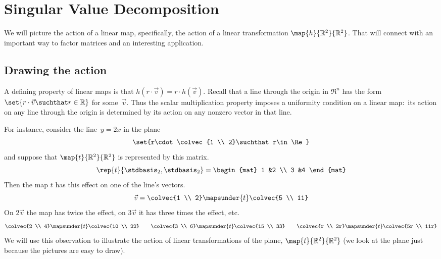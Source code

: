 \chapter{Singular Value Decomposition}
\label{chap:SingularValueDecomposition}

We will picture the action of a linear map,
specifically, the action of a linear transformation $\map{h}{\Re^2}{\Re^2}$.
That will connect with an important way to factor matrices
and an interesting application.


\section{Drawing the action}
A defining property of linear maps is that 
$h(r\cdot\vec{v})=r\cdot h(\vec{v})$.
Recall that a line through the origin in $\Re^n$ has the form 
$\set{r\cdot \vec{v}\suchthat r\in\Re}$ for some~$\vec{v}$. 
Thus the scalar multiplication property  
imposes a uniformity condition on a linear map:~its action on any 
line through the origin is determined by its action
on any nonzero vector in that line.

For instance, consider the line~$y=2x$ in the plane
\begin{equation*}
  \set{r\cdot\colvec{1 \\ 2}\suchthat r\in\Re}
\end{equation*}
and suppose that $\map{t}{\Re^2}{\Re^2}$ is represented by this matrix.
\begin{equation*}
  \rep{t}{\stdbasis_2,\stdbasis_2}
  =
  \begin{mat}
    1 &2 \\
    3 &4
  \end{mat}
\end{equation*}
Then the map $t$ has this effect on one of the line's vectors.
\begin{equation*}
  \vec{v}=\colvec{1 \\ 2}\mapsunder{t}\colvec{5 \\ 11}
\end{equation*}
On $2\vec{v}$ the 
map has twice the effect, on  $3\vec{v}$ it has three times the
effect, etc.
\begin{equation*}
  \colvec{2 \\ 4}\mapsunder{t}\colvec{10 \\ 22}
  \qquad
  \colvec{3 \\ 6}\mapsunder{t}\colvec{15 \\ 33}
  \qquad
  \colvec{r \\ 2r}\mapsunder{t}\colvec{5r \\ 11r}
\end{equation*}
We will use this observation to illustrate the action of 
linear transformations of the plane, $\map{t}{\Re^2}{\Re^2}$
(we look at the plane just because the pictures are 
easy to draw). 

